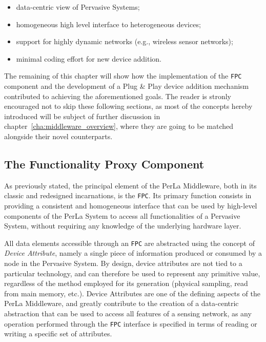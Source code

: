 \begin{itemize}

    \item data-centric view of Pervasive Systems;

    \item homogeneous high level interface to heterogeneous
        devices;

    \item support for highly dynamic networks (e.g., wireless
        sensor networks);

    \item minimal coding effort for new device addition.

\end{itemize}

The remaining of this chapter will show how the implementation of the
\texttt{FPC} component and the development of a Plug \& Play device addition
mechanism contributed to achieving the aforementioned goals. The reader is
stronly encouraged not to skip these following sections, as most of the
concepts hereby introduced will be subject of further discussion in
chapter~\ref{cha:middleware_overview}, where they are going to be matched
alongside their novel counterparts.

\subsection{The Functionality Proxy Component}

As previously stated, the principal element of the PerLa Middleware, both in
its classic and redesigned incarnations, is the \texttt{FPC}. Its primary
function consists in providing a consistent and homogeneous interface that can
be used by high-level components of the PerLa System to access all
functionalities of a Pervasive System, without requiring any knowledge of the
underlying hardware layer.

All data elements accessible through an \texttt{FPC} are abstracted using the
concept of \textit{Device Attribute}, namely a single piece of information
produced or consumed by a node in the Pervasive System. By design, device
attributes are not tied to a particular technology, and can therefore be used
to represent any primitive value, regardless of the method employed for its
generation (physical sampling, read from main memory, etc.). Device Attributes
are one of the defining aspects of the PerLa Middleware, and greatly contribute
to the creation of a data-centric abstraction that can be used to access all
features of a sensing network, as any operation performed through the
\texttt{FPC} interface is specified in terms of reading or writing a specific
set of attributes.

